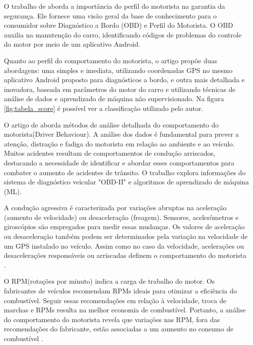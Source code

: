 O trabalho de \cite{Navneeth,2020} aborda a importância do perfil do motorista na garantia da segurança. Ele fornece uma visão geral da base de conhecimento para o consumidor sobre Diagnóstico a Bordo (OBD) e Perfil do Motorista. O OBD auxilia na manutenção do carro, identificando códigos de problemas do controle do motor por meio de um aplicativo Android. 

Quanto ao perfil do comportamento do motorista, o artigo propõe duas abordagens: uma simples e imediata, utilizando coordenadas GPS no mesmo aplicativo Android proposto para diagnósticos a bordo, e outra mais detalhada e inovadora, baseada em parâmetros do motor do carro e utilizando técnicas de análise de dados e aprendizado de máquina não supervisionado.
Na figura \ref{fig:tabela_score} é possível ver a classificação utilizado pelo autor.

O artigo de \cite{Malik Meenakshi, 2023} aborda métodos de análise detalhada do comportamento do motorista(Driver Behaviour). A análise dos dados é fundamental para prever a atenção, distração e fadiga do motorista em relação ao ambiente e ao veículo. Muitos acidentes resultam de comportamentos de condução arriscados, destacando a necessidade de identificar e abordar esses comportamentos para combater o aumento de acidentes de trânsito. O trabalho explora informações do sistema de diagnóstico veicular "OBD-II"  e algoritmos de aprendizado de máquina (ML).

A condução agressiva é caracterizada por variações abruptas na aceleração (aumento de velocidade) ou desaceleração (freagem). Sensores, acelerômetros e giroscópios são empregados para medir essas mudanças. Os valores de aceleração ou desaceleração também podem ser determinados pela variação na velocidade de um GPS instalado no veículo. Assim como no caso da velocidade, acelerações ou desacelerações responsáveis ou arriscadas definem o comportamento do motorista \cite{Malik Meenakshi, 2023}.

O RPM(rotações por minuto) indica a carga de trabalho do motor.  Os fabricantes de veículos recomendam RPMs ideais para otimizar a eficiência do combustível. Seguir essas recomendações em relação à velocidade, troca de marchas e RPMs resulta na melhor economia de combustível. Portanto, a análise do comportamento do motorista revela que variações nas RPM, fora das recomendações do fabricante, estão associadas a um aumento no consumo de combustível \cite{Malik Meenakshi, 2023}.




